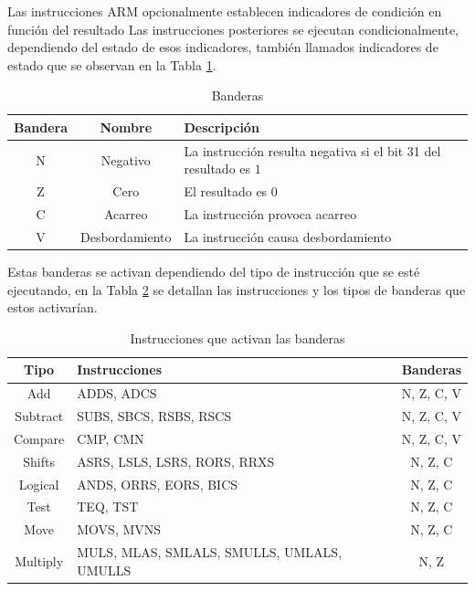 \documentclass[journal,trans]{IEEEtran}
\begin{document}
	Las instrucciones ARM opcionalmente establecen indicadores de condición en función del resultado Las instrucciones posteriores se ejecutan condicionalmente, dependiendo del estado de esos indicadores, también llamados indicadores de estado que se observan en la Tabla \ref{tab:Banderas}.
	
	\begin{table}[h]
		\centering
		\begin{tabular}{|c|c|p{4.5cm}|}
			\hline
			Bandera & Nombre         & Descripción \\
			\hline
			\hline
			N       & Negativo       & La instrucción resulta negativa si el bit 31 del resultado es $1$ \\
			\hline
			Z       & Cero           & El resultado es 0 \\
			\hline
			C       & Acarreo        & La instrucción provoca acarreo \\
			\hline
			V       & Desbordamiento & La instrucción causa desbordamiento \\
			\hline
		\end{tabular}
		\caption{Banderas}
		\label{tab:Banderas}
	\end{table}

	Estas banderas se activan dependiendo del tipo de instrucción que se esté ejecutando, en la Tabla \ref{tab:FlagsInstructions} se detallan las instrucciones y los tipos de banderas que estos activarían. 
	
	\begin{table}[h]
		\centering
		\begin{tabular}{|c|p{5cm}|c|}
			\hline
			Tipo      & Instrucciones                              & Banderas   \\
			\hline
			\hline
			Add      & ADDS, ADCS                                 & N, Z, C, V \\
			\hline
			Subtract & SUBS, SBCS, RSBS, RSCS                     & N, Z, C, V \\
			\hline
			Compare  & CMP, CMN                                   & N, Z, C, V \\
			\hline
			Shifts   & ASRS, LSLS, LSRS, RORS, RRXS               & N, Z, C    \\
			\hline
			Logical  & ANDS, ORRS, EORS, BICS                     & N, Z, C    \\
			\hline
			Test     & TEQ, TST                                   & N, Z, C    \\
			\hline
			Move     & MOVS, MVNS                                 & N, Z, C    \\
			\hline
			Multiply & MULS, MLAS, SMLALS, SMULLS, UMLALS, UMULLS & N, Z       \\
			\hline
		\end{tabular}
		\caption{Instrucciones que activan las banderas}
		\label{tab:FlagsInstructions}
	\end{table}
	
\end{document}
